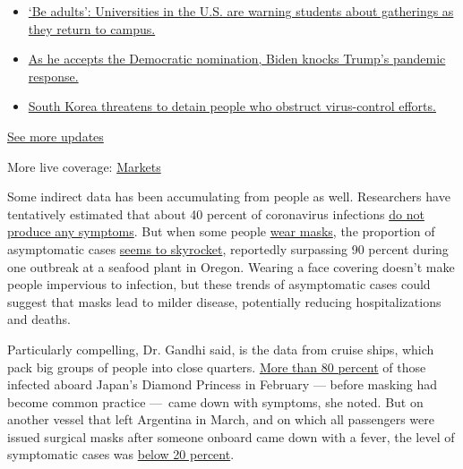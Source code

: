 \begin{itemize}
\tightlist
\item
  \href{https://www.nytimes3xbfgragh.onion/2020/08/21/world/covid-19-coronavirus.html?action=click\&pgtype=Article\&state=default\&region=MAIN_CONTENT_1\&context=storylines_live_updates\#link-6a60a19d}{`Be
  adults': Universities in the U.S. are warning students about
  gatherings as they return to campus.}
\item
  \href{https://www.nytimes3xbfgragh.onion/2020/08/21/world/covid-19-coronavirus.html?action=click\&pgtype=Article\&state=default\&region=MAIN_CONTENT_1\&context=storylines_live_updates\#link-324af071}{As
  he accepts the Democratic nomination, Biden knocks Trump's pandemic
  response.}
\item
  \href{https://www.nytimes3xbfgragh.onion/2020/08/21/world/covid-19-coronavirus.html?action=click\&pgtype=Article\&state=default\&region=MAIN_CONTENT_1\&context=storylines_live_updates\#link-191d44be}{South
  Korea threatens to detain people who obstruct virus-control efforts.}
\end{itemize}

\href{https://www.nytimes3xbfgragh.onion/2020/08/21/world/covid-19-coronavirus.html?action=click\&pgtype=Article\&state=default\&region=MAIN_CONTENT_1\&context=storylines_live_updates}{See
more updates}

More live coverage:
\href{https://www.nytimes3xbfgragh.onion/live/2020/08/21/business/stock-market-today-coronavirus?action=click\&pgtype=Article\&state=default\&region=MAIN_CONTENT_1\&context=storylines_live_updates}{Markets}

Some indirect data has been accumulating from people as well.
Researchers have tentatively estimated that about 40 percent of
coronavirus infections
\href{https://www.cdc.gov/coronavirus/2019-ncov/hcp/planning-scenarios.html}{do
not produce any symptoms}. But when some people
\href{https://www.oregonlive.com/coronavirus/2020/06/big-coronavirus-outbreak-at-newport-seafood-plants-is-contained-health-authorities-say.html}{wear
masks}, the proportion of asymptomatic cases
\href{https://apnews.com/4b9d38f206db9ce5267a5898ac24f238}{seems to
skyrocket}, reportedly surpassing 90 percent during one outbreak at a
seafood plant in Oregon. Wearing a face covering doesn't make people
impervious to infection, but these trends of asymptomatic cases could
suggest that masks lead to milder disease, potentially reducing
hospitalizations and deaths.

Particularly compelling, Dr. Gandhi said, is the data from cruise ships,
which pack big groups of people into close quarters.
\href{https://www.ncbi.nlm.nih.gov/pmc/articles/PMC7078829/}{More than
80 percent} of those infected aboard Japan's Diamond Princess in
February --- before masking had become common practice ---~came down
with symptoms, she noted. But on another vessel that left Argentina in
March, and on which all passengers were issued surgical masks after
someone onboard came down with a fever, the level of symptomatic cases
was \href{https://thorax.bmj.com/content/75/8/693}{below 20 percent}.

